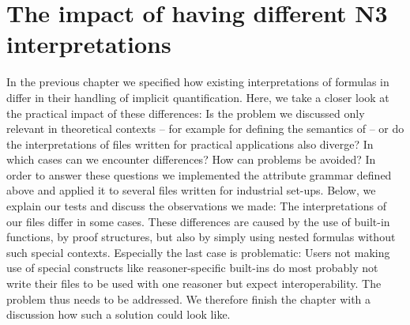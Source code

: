 
\chapter{The impact of having different N3 interpretations}\label{eva}
In the previous chapter we 
specified how existing interpretations of formulas in \nthreelogic differ in their handling of implicit quantification. Here, 
we take a closer look at the practical impact of these differences: 
Is the problem we discussed only relevant in theoretical contexts -- for example for defining the semantics of \nthreelogic{} -- or do the interpretations 
of files written for practical applications also diverge?
In which cases can we encounter differences? How can problems be avoided?
% 
In order to answer these questions we implemented the attribute grammar defined above and applied it to several \nthree files written for industrial set-ups.
Below, we explain our tests and discuss the observations we made: The interpretations of our files differ in some cases. These differences are
caused by the use of built-in functions, by proof 
structures, but also by simply using nested formulas without such special contexts. Especially the last case is problematic: Users not making use of special constructs like 
reasoner-specific built-ins do most probably not write their files to be used with one reasoner but expect interoperability.
The problem thus needs to be addressed.
We therefore finish the chapter with a discussion how such a solution could look like.

% 
%

